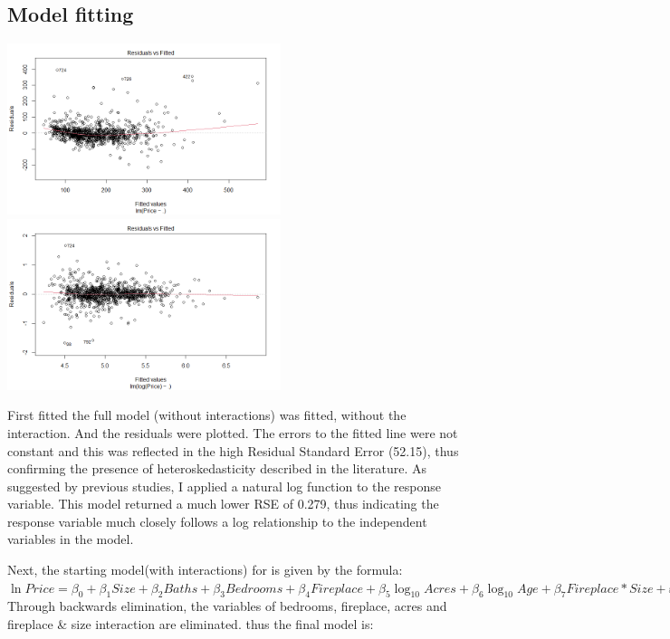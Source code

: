 \documentclass[10pt,A4,makeidx]{article}
\begin{document}
  \subsection{Model fitting}
  \begin{center}
    \includegraphics[width=8cm]{full-res.png}
    \includegraphics[width=8cm]{full-resln.png}
  \end{center}
  First fitted the full model (without interactions) was fitted, without the interaction. And the residuals were plotted.
  The errors to the fitted line were not constant and this was reflected in the high Residual Standard Error
  (52.15), thus confirming the presence of heteroskedasticity described in the literature.
  As suggested by previous studies, I applied a natural log function to the response variable.
  This model returned a much lower RSE of 0.279, thus indicating the response variable
  much closely follows a log relationship to the independent variables in the model.

  Next, the  starting model(with interactions) for is given by the formula:\\

  \(\ln Price = \beta _0 + \beta _1 Size + \beta _2 Baths + \beta _3 Bedrooms + \beta _4 Fireplace + \beta _5 \log_{10}Acres + \beta _6 \log_{10}Age + \beta _7 Fireplace*Size + \varepsilon\)\\

  Through backwards elimination, the variables of bedrooms, fireplace, acres and
  fireplace \& size interaction are eliminated. thus the final model is:\\
  
\end{document}
